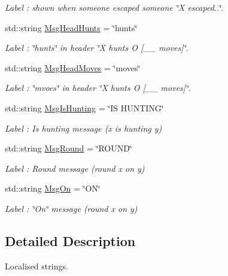 \begin{DoxyCompactItemize}
\begin{DoxyCompactList}\small\item\em Label \-: shown when someone escaped someone \char`\"{}\-X escaped..\char`\"{}. \end{DoxyCompactList}\item 
std\-::string \hyperlink{struct_chase_game_1_1_s_lang_strings_ae50e2fb23b58db21d1e9eeae0724a480}{Msg\-Head\-Hunts} = \char`\"{}hunts\char`\"{}
\begin{DoxyCompactList}\small\item\em Label \-: \char`\"{}hunts\char`\"{} in header \char`\"{}\-X hunts O \mbox{[}\-\_\-\-\_\- moves\mbox{]}\char`\"{}. \end{DoxyCompactList}\item 
std\-::string \hyperlink{struct_chase_game_1_1_s_lang_strings_a06fad00de9d27f4b289c01728ab55be1}{Msg\-Head\-Moves} = \char`\"{}moves\char`\"{}
\begin{DoxyCompactList}\small\item\em Label \-: \char`\"{}mvoes\char`\"{} in header \char`\"{}\-X hunts O \mbox{[}\-\_\-\-\_\- moves\mbox{]}\char`\"{}. \end{DoxyCompactList}\item 
std\-::string \hyperlink{struct_chase_game_1_1_s_lang_strings_ae186b81b6002ed3e2d795e5adecca95e}{Msg\-Is\-Hunting} = \char`\"{}I\-S H\-U\-N\-T\-I\-N\-G\char`\"{}
\begin{DoxyCompactList}\small\item\em Label \-: Is hunting message (x is hunting y) \end{DoxyCompactList}\item 
std\-::string \hyperlink{struct_chase_game_1_1_s_lang_strings_a637a94fa33b573cec57d98e6855c823f}{Msg\-Round} = \char`\"{}R\-O\-U\-N\-D\char`\"{}
\begin{DoxyCompactList}\small\item\em Label \-: Round message (round x on y) \end{DoxyCompactList}\item 
std\-::string \hyperlink{struct_chase_game_1_1_s_lang_strings_af30da50d583af601645117d472aace34}{Msg\-On} = \char`\"{}O\-N\char`\"{}
\begin{DoxyCompactList}\small\item\em Label \-: \char`\"{}\-On\char`\"{} message (round x on y) \end{DoxyCompactList}\end{DoxyCompactItemize}


\subsection{Detailed Description}
Localised strings. 

